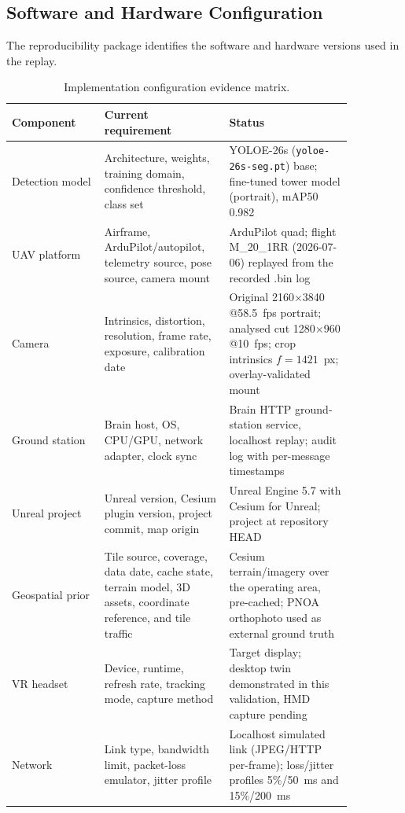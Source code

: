 \documentclass[fleqn]{VRIH2025}
\newcommand{\code}[1]{\texttt{#1}}
\begin{document}

\subsection{Software and Hardware Configuration}

The reproducibility package identifies the software and hardware versions used in the replay.

\begin{table}[H]
\centering
\small
\caption{Implementation configuration evidence matrix.}
\label{tab:configuration}
\begin{tabular}{@{}L{0.24\linewidth}L{0.30\linewidth}L{0.32\linewidth}@{}}
\toprule
Component & Current requirement & Status \\
\midrule
Detection model & Architecture, weights, training domain, confidence threshold, class set & YOLOE-26s (\code{yoloe-26s-seg.pt}) base; fine-tuned tower model (portrait), mAP50 0.982 \\
UAV platform & Airframe, ArduPilot/autopilot, telemetry source, pose source, camera mount & ArduPilot quad; flight M\_20\_1RR (2026-07-06) replayed from the recorded .bin log \\
Camera & Intrinsics, distortion, resolution, frame rate, exposure, calibration date & Original 2160$\times$3840 @58.5~fps portrait; analysed cut 1280$\times$960 @10~fps; crop intrinsics $f{=}1421$~px; overlay-validated mount \\
Ground station & Brain host, OS, CPU/GPU, network adapter, clock sync & Brain HTTP ground-station service, localhost replay; audit log with per-message timestamps \\
Unreal project & Unreal version, Cesium plugin version, project commit, map origin & Unreal Engine 5.7 with Cesium for Unreal; project at repository HEAD \\
Geospatial prior & Tile source, coverage, data date, cache state, terrain model, 3D assets, coordinate reference, and tile traffic & Cesium terrain/imagery over the operating area, pre-cached; PNOA orthophoto used as external ground truth \\
VR headset & Device, runtime, refresh rate, tracking mode, capture method & Target display; desktop twin demonstrated in this validation, HMD capture pending \\
Network & Link type, bandwidth limit, packet-loss emulator, jitter profile & Localhost simulated link (JPEG/HTTP per-frame); loss/jitter profiles 5\%/50~ms and 15\%/200~ms \\
\bottomrule
\end{tabular}
\normalsize
\end{table}
\end{document}
